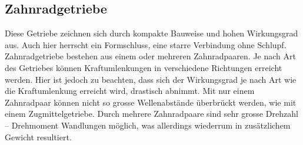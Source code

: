 \subsection{Zahnradgetriebe}
Diese Getriebe zeichnen sich durch kompakte Bauweise und hohen Wirkungsgrad aus. Auch hier herrscht ein Formschluss,  eine starre Verbindung ohne Schlupf. Zahnradgetriebe bestehen aus einem oder mehreren Zahnradpaaren. Je nach Art des Getriebes können Kraftumlenkungen in verschiedene Richtungen erreicht werden. Hier ist jedoch zu beachten, dass sich der Wirkungsgrad je nach Art wie die Kraftumlenkung erreicht wird, drastisch abnimmt. Mit nur einem Zahnradpaar können nicht so grosse Wellenabstände überbrückt werden, wie mit einem Zugmittelgetriebe. Durch mehrere Zahnradpaare sind sehr grosse Drehzahl – Drehmoment Wandlungen möglich, was allerdings wiederrum in zusätzlichem Gewicht resultiert. 
